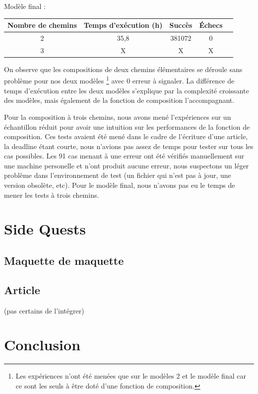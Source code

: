 \documentclass[oneside, a4paper, 11pt]{book}
\begin{document}
\begin{center}
	Modèle final :
\begin{tabular}{|c|c|c|c|c|}
	\hline
	Nombre de chemins & Temps d'exécution (h) & Succès & Échecs\\
	\hline
	2 & 35,8 & 381072 & 0 \\
	\hline
	3 & X  & X & X \\
	\hline
\end{tabular}
\end{center}

On observe que les compositions de deux chemins élémentaires se déroule sans problème pour nos deux modèles \footnote{Les expériences n'ont été menées que sur le modèles 2 et le modèle final car ce sont les seuls à être doté d'une fonction de composition.} avec 0 erreur à signaler.
La différence de temps d'exécution entre les deux modèles s'explique par la complexité croissante des modèles, mais également de la fonction de composition l'accompagnant.

Pour la composition à trois chemins, nous avons mené l'expériences sur un échantillon réduit pour avoir une intuition sur les performances de la fonction de composition. Ces tests avaient été mené dans le cadre de l'écriture d'une article, la deadline étant courte, nous n'avions pas assez de temps pour tester sur tous les cas possibles.
Les 91 cas menant à une erreur ont été vérifiés manuellement sur une machine personelle et n'ont produit aucune erreur, nous suspectons un léger problème dans l'environnement de test (un fichier qui n'est pas à jour, une version obsolète, etc).  
Pour le modèle final, nous n'avons pas eu le temps de mener les tests à trois chemins.




\chapter{Side Quests}
\label{sec:sidequests}

\section{Maquette de maquette}
\section{Article}
(pas certains de l'intégrer)




\chapter{Conclusion}
\end{document}
